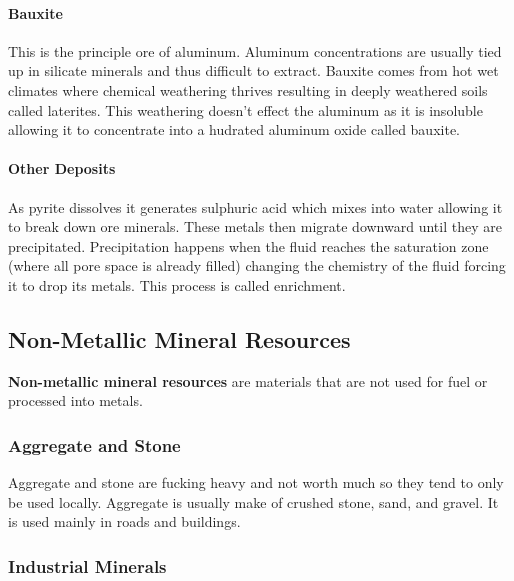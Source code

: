 \documentclass{article}
\begin{document}
\paragraph{Bauxite} %
\label{par:bauxite}
This is the principle ore of aluminum. Aluminum concentrations are usually tied up in silicate minerals and thus difficult to extract. Bauxite comes from hot wet climates where chemical weathering thrives resulting in deeply weathered soils called laterites. This weathering doesn't effect the aluminum as it is insoluble allowing it to concentrate into a hudrated aluminum oxide called bauxite.

\paragraph{Other Deposits} %
\label{par:other_deposits}
As pyrite dissolves it generates sulphuric acid which mixes into water allowing it to break down ore minerals. These metals then migrate downward until they are precipitated. Precipitation happens when the fluid reaches the saturation zone (where all pore space is already filled) changing the chemistry of the fluid forcing it to drop its metals. This process is called enrichment.



\subsection{Non-Metallic Mineral Resources} %
\label{sub:non_metallic_mineral_resources}
\textbf{Non-metallic mineral resources} are materials that are not used for fuel or processed into metals.

\subsubsection{Aggregate and Stone} %
\label{sub:aggregate_and_stone}
Aggregate and stone are fucking heavy and not worth much so they tend to only be used locally. Aggregate is usually make of crushed stone, sand, and gravel. It is used mainly in roads and buildings.

\subsubsection{Industrial Minerals} %
\label{sub:industrial_minerals}
\end{document}
